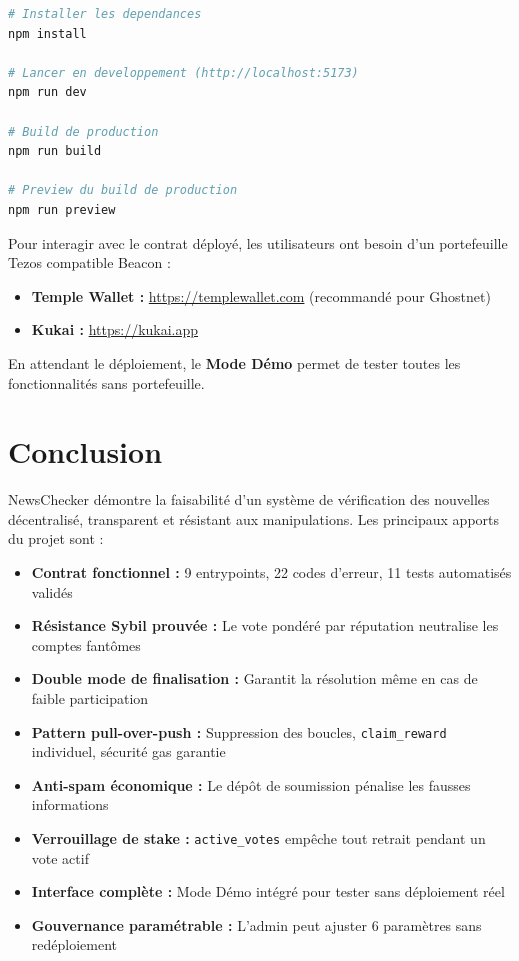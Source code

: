 \documentclass[12pt,a4paper]{article}
\newenvironment{warnbox}[1][Attention]{%
  \begin{tcolorbox}[
    enhanced, breakable,
    colback=warning!8, colframe=warning!70, coltitle=white,
    title=\textbf{#1}, fonttitle=\small,
    arc=4pt, boxrule=0.8pt,
    left=6pt, right=6pt, top=5pt, bottom=5pt
  ]
}{\end{tcolorbox}}
\newenvironment{successbox}[1][Résultat]{%
  \begin{tcolorbox}[
    enhanced, breakable,
    colback=success!8, colframe=success!70, coltitle=white,
    title=\textbf{#1}, fonttitle=\small,
    arc=4pt, boxrule=0.8pt,
    left=6pt, right=6pt, top=5pt, bottom=5pt
  ]
}{\end{tcolorbox}}
\begin{document}
\begin{lstlisting}[language=bash, caption={Commandes de démarrage}]
# Installer les dependances
npm install

# Lancer en developpement (http://localhost:5173)
npm run dev

# Build de production
npm run build

# Preview du build de production
npm run preview
\end{lstlisting}

\begin{warnbox}[Wallet requis pour le mode réel]
Pour interagir avec le contrat déployé, les utilisateurs ont besoin d'un portefeuille Tezos compatible Beacon :
\begin{itemize}
  \item \textbf{Temple Wallet :} \url{https://templewallet.com} (recommandé pour Ghostnet)
  \item \textbf{Kukai :} \url{https://kukai.app}
\end{itemize}
En attendant le déploiement, le \textbf{Mode Démo} permet de tester toutes les fonctionnalités sans portefeuille.
\end{warnbox}

\section{Conclusion}

NewsChecker démontre la faisabilité d'un système de vérification des nouvelles décentralisé, transparent et résistant aux manipulations. Les principaux apports du projet sont :

\begin{successbox}[Résultats obtenus]
\begin{itemize}
  \item \textbf{Contrat fonctionnel :} 9 entrypoints, 22 codes d'erreur, 11 tests automatisés validés
  \item \textbf{Résistance Sybil prouvée :} Le vote pondéré par réputation neutralise les comptes fantômes
  \item \textbf{Double mode de finalisation :} Garantit la résolution même en cas de faible participation
  \item \textbf{Pattern pull-over-push :} Suppression des boucles, \texttt{claim\_reward} individuel, sécurité gas garantie
  \item \textbf{Anti-spam économique :} Le dépôt de soumission pénalise les fausses informations
  \item \textbf{Verrouillage de stake :} \texttt{active\_votes} empêche tout retrait pendant un vote actif
  \item \textbf{Interface complète :} Mode Démo intégré pour tester sans déploiement réel
  \item \textbf{Gouvernance paramétrable :} L'admin peut ajuster 6 paramètres sans redéploiement
\end{itemize}
\end{successbox}
\end{document}

